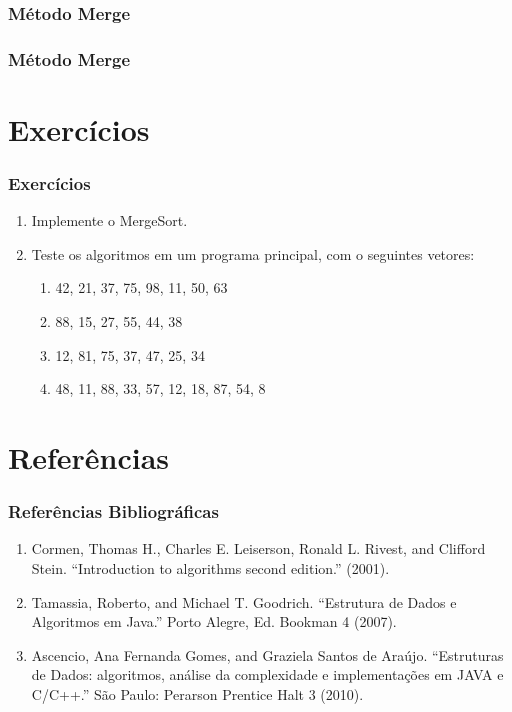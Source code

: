 \documentclass{beamer}
\begin{document}
\begin{frame}
	\frametitle{Método Merge}
    \centering
    
\end{frame}

\begin{frame}
	\frametitle{Método Merge}
    \centering
    
\end{frame}

\section{Exercícios}

\begin{frame}
    \frametitle{Exercícios}

    \begin{enumerate}
        \item Implemente o MergeSort.
        \item Teste os algoritmos em um programa principal, com o seguintes vetores:
        \begin{enumerate}
            \item 42, 21, 37, 75, 98, 11, 50, 63
            \item 88, 15, 27, 55, 44, 38
            \item 12, 81, 75, 37, 47, 25, 34
            \item 48, 11, 88, 33, 57, 12, 18, 87, 54, 8
        \end{enumerate}
    \end{enumerate}
\end{frame}

\section{Referências}

\begin{frame}
    \frametitle{Referências Bibliográficas}
    \begin{enumerate}
        \item Cormen, Thomas H., Charles E. Leiserson, Ronald L. Rivest, and Clifford Stein. ``Introduction to algorithms second edition.'' (2001).
        \item Tamassia, Roberto, and Michael T. Goodrich. ``Estrutura de Dados e Algoritmos em Java.'' Porto Alegre, Ed. Bookman 4 (2007).
        \item Ascencio, Ana Fernanda Gomes, and Graziela Santos de Araújo. ``Estruturas de Dados: algoritmos, análise da complexidade e implementações em JAVA e C/C++.'' São Paulo: Perarson Prentice Halt 3 (2010).
    \end{enumerate}
\end{frame}
\end{document}

